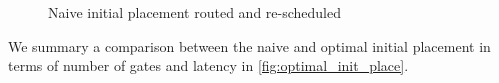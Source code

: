 \begin{figure}[H]
\centering


\label{fig:map_ex_resch}
\caption{Naive initial placement routed and re-scheduled}
\end{figure}
We summary a comparison between the naive and optimal initial placement in terms of number of gates and latency in \ref{fig:optimal_init_place}.



